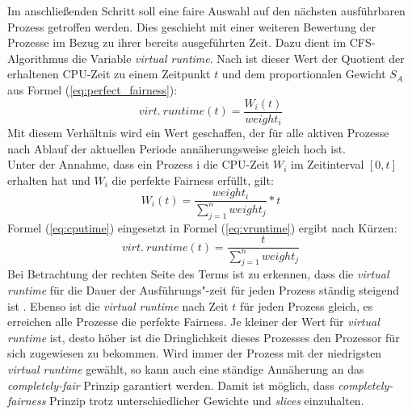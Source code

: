 Im anschließenden Schritt soll eine faire Auswahl auf den nächsten ausführbaren Prozess getroffen werden. Dies geschieht mit einer weiteren Bewertung der Prozesse im Bezug zu ihrer bereits ausgeführten Zeit. Dazu dient im CFS-Algorithmus die Variable \textit{virtual runtime}. Nach \cite{usenix} ist dieser Wert der Quotient der erhaltenen CPU-Zeit zu einem Zeitpunkt $t$ und dem proportionalen Gewicht $S_A$ aus Formel (\ref{eq:perfect_fairness}):
\begin{equation}
virt. \ runtime(t) = \frac{W_{i}(t)}{weight_{i}}
\label{eq:vruntime}
\end{equation}
Mit diesem Verhältnis wird ein Wert geschaffen, der für alle aktiven Prozesse nach Ablauf der aktuellen Periode annäherungs\-weise gleich hoch ist.\\
Unter der Annahme, dass ein Prozess i die CPU-Zeit $W_{i}$ im Zeitinterval $[0,t]$ erhalten hat und $W_{i}$ die perfekte Fairness erfüllt, gilt:
\begin{equation}
W_{i}(t) = \frac{weight_{i}}{\sum_{j=1}^{n} weight_j} * t
\label{eq:cputime}
\end{equation}
Formel (\ref{eq:cputime}) eingesetzt in Formel (\ref{eq:vruntime}) ergibt nach Kürzen:
\begin{equation}
virt. \ runtime(t) = \frac{t}{\sum_{j=1}^{n} weight_j}
\label{eq:vruntime2}
\end{equation}
Bei Betrachtung der rechten Seite des Terms ist zu erkennen, dass die \textit{virtual runtime} für die Dauer der Ausführungs"-zeit für jeden Prozess ständig steigend ist \cite{rlove}. Ebenso ist die \textit{virtual runtime} nach Zeit $t$ für jeden Prozess gleich, es erreichen alle Prozesse die perfekte Fairness. 
Je kleiner der Wert für \textit{virtual runtime} ist, desto höher ist die Dringlichkeit dieses Prozesses den Prozessor für sich zugewiesen zu bekommen. 
Wird immer der Prozess mit der niedrigsten \textit{virtual runtime} gewählt, so kann auch eine ständige An\-nähe\-rung an das \textit{completely-fair} Prinzip garantiert werden. 
Damit ist möglich, dass \textit{completely-fairness} Prinzip trotz unterschiedlicher Gewichte und \textit{slices} einzuhalten.

